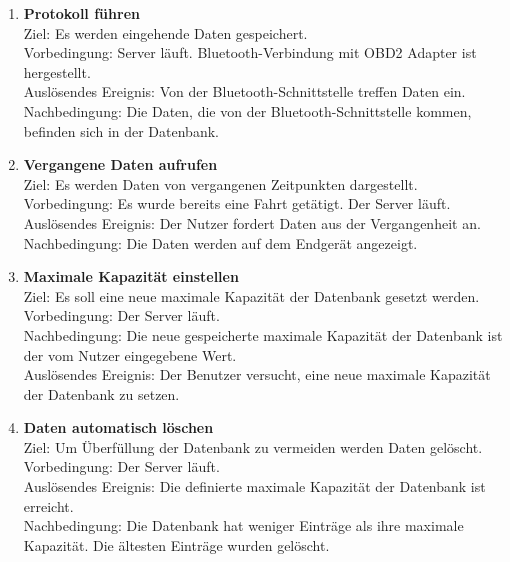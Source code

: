 \documentclass[pflichtenheft.tex]{subfiles}
\begin{document}
	\begin{enumerate}
		\setcounter{enumi}{\value{enumTemp}}
		\item{\textbf{Protokoll führen}} \\ Ziel: Es werden eingehende Daten gespeichert. \\ Vorbedingung: Server läuft. Bluetooth-Verbindung mit OBD2 Adapter ist hergestellt. \\ Auslösendes Ereignis: Von der Bluetooth-Schnittstelle treffen Daten ein. %
		Nachbedingung: Die Daten, die von der Bluetooth-Schnittstelle kommen, befinden sich in der Datenbank.
		
		\item{\textbf{Vergangene Daten aufrufen}} \\ Ziel: Es werden Daten von vergangenen Zeitpunkten dargestellt. \\ Vorbedingung: Es wurde bereits eine Fahrt getätigt. Der Server läuft.\\ Auslösendes Ereignis: Der Nutzer fordert Daten aus der Vergangenheit an. \\ Nachbedingung: Die Daten werden auf dem Endgerät angezeigt.
	
		\item{\textbf{Maximale Kapazität einstellen}} \\ Ziel: Es soll eine neue maximale Kapazität der Datenbank gesetzt werden. \\ Vorbedingung: Der Server läuft. \\Nachbedingung: Die neue gespeicherte maximale Kapazität der Datenbank ist der vom Nutzer eingegebene Wert. \\Auslösendes Ereignis: Der Benutzer versucht, eine neue maximale Kapazität der Datenbank zu setzen. 
		
		\item{\textbf{Daten automatisch löschen}} \\ Ziel: Um Überfüllung der Datenbank zu vermeiden werden Daten gelöscht. \\ Vorbedingung: Der Server läuft. \\ Auslösendes Ereignis: Die definierte maximale Kapazität der Datenbank ist erreicht. \\ Nachbedingung: Die Datenbank hat weniger Einträge als ihre maximale Kapazität. Die ältesten Einträge wurden gelöscht.

		\renewcommand{\theenumi}{/FA\ifnum \value{enumi}<10 0\fi\arabic{enumi}0W/}
		\renewcommand{\labelenumi}{\theenumi}
		\renewcommand{\theenumii}{\arabic{enumii}}
		\renewcommand{\labelenumii}{/FA\ifnum \value{enumi}<10 0\fi\arabic{enumi}\arabic{enumii}W/}


\end{enumerate}
\end{document}
